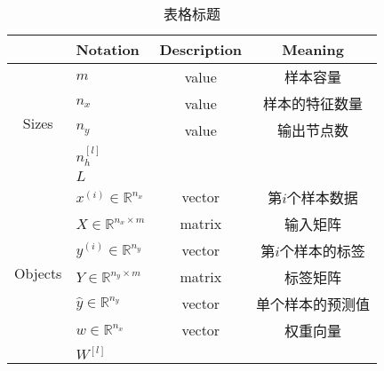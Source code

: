 	\begin{table}[h]
		\centering
		\begin{threeparttable}
		\caption{表格标题}
		\begin{tabular}{clcc}
			\hline
									 & \textbf{Notation}                   & \textbf{Description} & \textbf{Meaning}                                                   \\ \hline
			\multirow{5}{*}{Sizes}   & $m$                                 & value                & 样本容量                                                               \\
									 & $n_x$                               & value                & 样本的特征数量                                                            \\
									 & $n_y$                               & value                & 输出节点数                                                              \\
									 & $n_h^{[l]}$                         &                      &                                                                    \\
									 & $L$                                 &                      &                                                                    \\ \hline
			\multirow{7}{*}{Objects} & $x^{(i)} \in \mathbb{R}^{n_x}$      & vector               & 第$i$个样本数据                                                          \\
									 & $X \in {\mathbb{R}^{n_x \times m}}$ & matrix               & 输入矩阵                                                               \\
									 & $y^{(i)} \in \mathbb{R}^{n_y}$      & vector               & 第$i$个样本的标签                                                         \\
									 & $Y \in {\mathbb{R}^{n_y \times m}}$ & matrix               & 标签矩阵                                                               \\
									 & $\hat{y} \in \mathbb{R}^{n_y}$      & vector               & 单个样本的预测值                                                           \\
									 & $w \in \mathbb{R}^{n_x}$            & vector               & 权重向量                                                               \\
									 & $W^{[l]}$                           &                      &                                                                    \\

\end{tabular}
\end{threeparttable}
\end{table}
